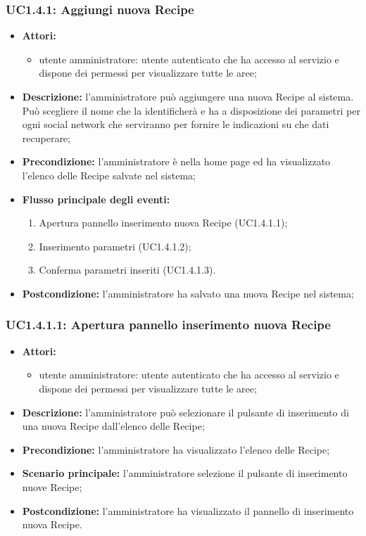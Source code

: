 \subsubsection{UC1.4.1: Aggiungi nuova Recipe}
\begin{itemize}
	\item \textbf{Attori:}
	\begin{itemize}
		\item utente amministratore: utente autenticato che ha accesso al servizio e dispone dei permessi per visualizzare tutte le aree;
	\end{itemize}
	\item \textbf{Descrizione:} l'amministratore può aggiungere una nuova Recipe al sistema. Può scegliere il nome che la identificherà e ha a disposizione dei parametri per ogni social network che serviranno per fornire le indicazioni su che dati recuperare;
	\item \textbf{Precondizione:} l'amministratore è nella home page ed ha visualizzato l'elenco delle Recipe salvate nel sistema;
	\item \textbf{Flusso principale degli eventi:}
	\begin{enumerate}
		\item Apertura pannello inserimento nuova Recipe (UC1.4.1.1);
		\item Inserimento parametri (UC1.4.1.2);
		\item Conferma parametri inseriti (UC1.4.1.3).
	\end{enumerate}
	\item \textbf{Postcondizione:} l'amministratore ha salvato una nuova Recipe nel sistema;
\end{itemize}

\subsubsection{UC1.4.1.1: Apertura pannello inserimento nuova Recipe}
\begin{itemize}
	\item \textbf{Attori:}
	\begin{itemize}
		\item utente amministratore: utente autenticato che ha accesso al servizio e dispone dei permessi per visualizzare tutte le aree;
	\end{itemize}
	\item \textbf{Descrizione:} l'amministratore può selezionare il pulsante di inserimento di una nuova Recipe dall'elenco delle Recipe;
	\item \textbf{Precondizione:} l'amministratore ha visualizzato l'elenco delle Recipe;
	\item \textbf{Scenario principale:} l'amministratore selezione il pulsante di inserimento nuove Recipe;
	\item \textbf{Postcondizione:} l'amministratore ha visualizzato il pannello di inserimento nuova Recipe.
\end{itemize}

